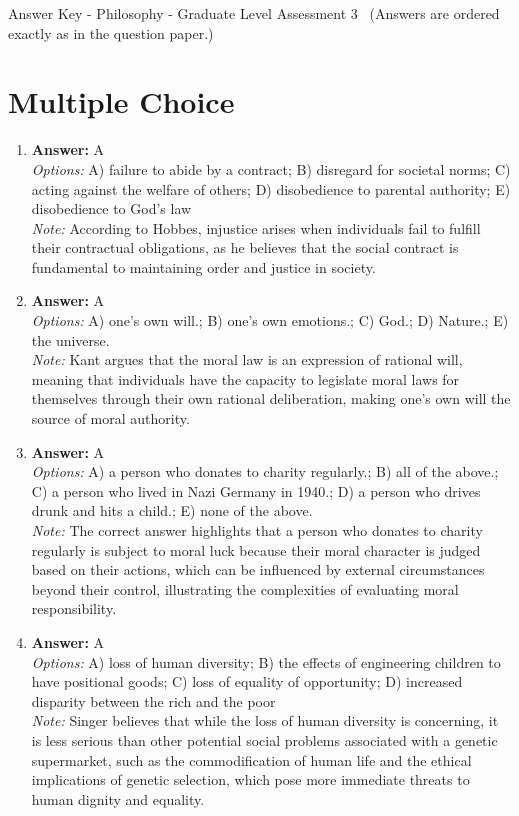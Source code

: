 \documentclass[12pt]{article}
\begin{document}
\begin{center}
Answer Key - Philosophy - Graduate Level Assessment 3 \
\small (Answers are ordered exactly as in the question paper.)
\end{center}

\section*{Multiple Choice}
\begin{enumerate}[label=\arabic*.]
\item \textbf{Answer:} A
\\ \textit{Options:} A) failure to abide by a contract; B) disregard for societal norms; C) acting against the welfare of others; D) disobedience to parental authority; E) disobedience to God's law
\\ \textit{Note:} According to Hobbes, injustice arises when individuals fail to fulfill their contractual obligations, as he believes that the social contract is fundamental to maintaining order and justice in society.
\item \textbf{Answer:} A
\\ \textit{Options:} A) one's own will.; B) one's own emotions.; C) God.; D) Nature.; E) the universe.
\\ \textit{Note:} Kant argues that the moral law is an expression of rational will, meaning that individuals have the capacity to legislate moral laws for themselves through their own rational deliberation, making one's own will the source of moral authority.
\item \textbf{Answer:} A
\\ \textit{Options:} A) a person who donates to charity regularly.; B) all of the above.; C) a person who lived in Nazi Germany in 1940.; D) a person who drives drunk and hits a child.; E) none of the above.
\\ \textit{Note:} The correct answer highlights that a person who donates to charity regularly is subject to moral luck because their moral character is judged based on their actions, which can be influenced by external circumstances beyond their control, illustrating the complexities of evaluating moral responsibility.
\item \textbf{Answer:} A
\\ \textit{Options:} A) loss of human diversity; B) the effects of engineering children to have positional goods; C) loss of equality of opportunity; D) increased disparity between the rich and the poor
\\ \textit{Note:} Singer believes that while the loss of human diversity is concerning, it is less serious than other potential social problems associated with a genetic supermarket, such as the commodification of human life and the ethical implications of genetic selection, which pose more immediate threats to human dignity and equality.

\end{enumerate}
\end{document}
